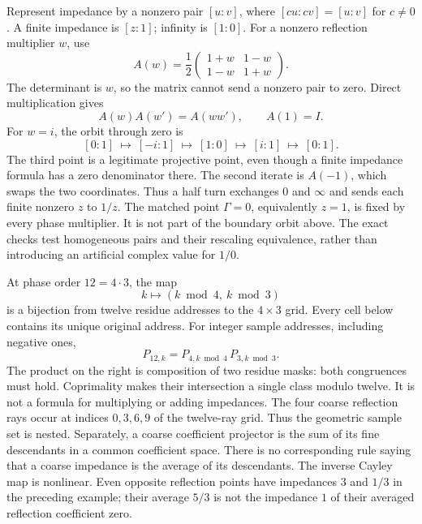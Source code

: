 Represent impedance by a nonzero pair $[u:v]$, where $[cu:cv]=[u:v]$ for $c\ne0$. A finite impedance is $[z:1]$; infinity is $[1:0]$. For a nonzero reflection multiplier $w$, use
\[
A(w)=\frac12\begin{pmatrix}1+w&1-w\\1-w&1+w\end{pmatrix}.
\]
The determinant is $w$, so the matrix cannot send a nonzero pair to zero. Direct multiplication gives
\[
A(w)A(w')=A(ww'),\qquad A(1)=I.
\]
For $w=i$, the orbit through zero is
\[
[0:1]\ \longmapsto\ [-i:1]\ \longmapsto\ [1:0]
\ \longmapsto\ [i:1]\ \longmapsto\ [0:1].
\]
The third point is a legitimate projective point, even though a finite impedance formula has a zero denominator there. The second iterate is $A(-1)$, which swaps the two coordinates. Thus a half turn exchanges $0$ and $\infty$ and sends each finite nonzero $z$ to $1/z$.
The matched point $\Gamma=0$, equivalently $z=1$, is fixed by every phase multiplier. It is not part of the boundary orbit above. The exact checks test homogeneous pairs and their rescaling equivalence, rather than introducing an artificial complex value for $1/0$.

At phase order $12=4\cdot3$, the map
\[
k\longmapsto(k\bmod4,\ k\bmod3)
\]
is a bijection from twelve residue addresses to the $4\times3$ grid. Every cell below contains its unique original address.
For integer sample addresses, including negative ones,
\[
P_{12,k}=P_{4,k\bmod4}\,P_{3,k\bmod3}.
\]
The product on the right is composition of two residue masks: both congruences must hold. Coprimality makes their intersection a single class modulo twelve. It is not a formula for multiplying or adding impedances.
The four coarse reflection rays occur at indices $0,3,6,9$ of the twelve-ray grid. Thus the geometric sample set is nested. Separately, a coarse coefficient projector is the sum of its fine descendants in a common coefficient space.
There is no corresponding rule saying that a coarse impedance is the average of its descendants. The inverse Cayley map is nonlinear. Even opposite reflection points have impedances $3$ and $1/3$ in the preceding example; their average $5/3$ is not the impedance $1$ of their averaged reflection coefficient zero.


